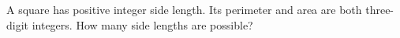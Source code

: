 A square has positive integer side length. Its perimeter and area are both three-digit integers. How many side lengths are possible?
